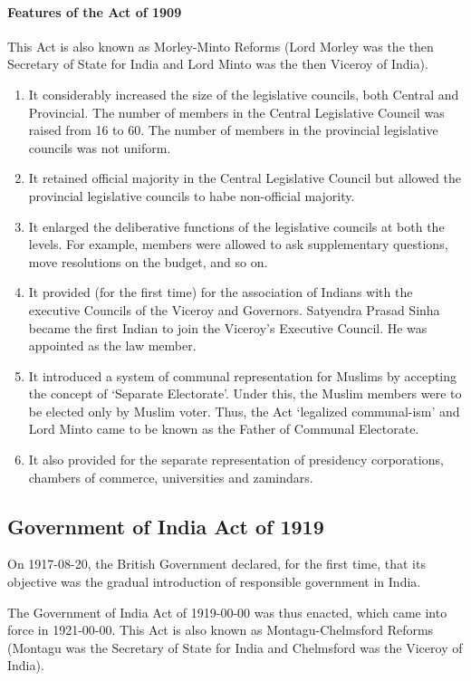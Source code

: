 \begin{multicols}{2}
\paragraph{Features of the Act of 1909}
This Act is also known as Morley-Minto Reforms (Lord Morley was the then Secretary of State for India and Lord Minto was the then Viceroy of India).
\begin{enumerate}
  \item It considerably increased the size of the legislative councils, both Central and Provincial. The number of members in the Central Legislative Council was raised from 16 to 60. The number of members in the provincial legislative councils was not uniform.
  \item It retained official majority in the Central Legislative Council but allowed the provincial legislative councils to habe non-official majority.
  \item It enlarged the deliberative functions of the legislative councils at both the levels. For example, members were allowed to ask supplementary questions, move resolutions on the budget, and so on.
  \item It provided (for the first time) for the association of Indians with the executive Councils of the Viceroy and Governors. Satyendra Prasad Sinha became the first Indian to join the Viceroy's Executive Council. He was appointed as the law member.
  \item It introduced a system of communal representation for Muslims by accepting the concept of `Separate Electorate'. Under this, the Muslim members were to be elected only by Muslim voter. Thus, the Act `legalized communal-ism' and Lord Minto came to be known as the Father of Communal Electorate.
  \item It also provided for the separate representation of presidency corporations, chambers of commerce, universities and zamindars.
\end{enumerate}

\subsection{Government of India Act of 1919}

On 1917-08-20, the British Government declared, for the first time, that its objective was the gradual introduction of responsible government in India\endnote.

The Government of India Act of 1919-00-00 was thus enacted, which came into force in 1921-00-00. This Act is also known as Montagu-Chelmsford Reforms (Montagu was the Secretary of State for India and Chelmsford was the Viceroy of India).


\end{multicols}
